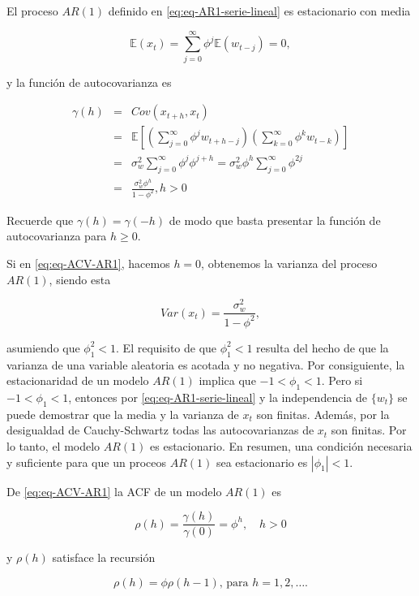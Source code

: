 \documentclass[12pt,]{krantz}
\theoremstyle{definition}
\theoremstyle{definition}
\theoremstyle{definition}
\theoremstyle{remark}
\begin{document}
El proceso \(AR(1)\) definido en \eqref{eq:eq-AR1-serie-lineal} es
estacionario con media

\[\mathbb{E}(x_t) = \sum_{j=0}^{\infty}\phi^j\mathbb{E}(w_{t-j})=0,\]

y la función de autocovarianza es

\begin{eqnarray}
\gamma(h) &=& Cov(x_{t+h},x_t) \nonumber \\
    &=& \mathbb{E}\left[\left(\sum_{j=0}^{\infty}\phi^jw_{t+h-j}\right) \left(\sum_{k=0}^{\infty}\phi^kw_{t-k}\right)\right] \nonumber \\
    &=& \sigma_w^2\sum_{j=0}^{\infty}\phi^j\phi^{j+h} = \sigma_w^2\phi^h\sum_{j=0}^{\infty}\phi^{2j} \nonumber \\
    &=& \frac{\sigma_w^2\phi^h}{1-\phi^2}, h>0
\label{eq:eq-ACV-AR1}
\end{eqnarray}

Recuerde que \(\gamma(h)=\gamma(-h)\) de modo que basta presentar la
función de autocovarianza para \(h\geq0\).

Si en \eqref{eq:eq-ACV-AR1}, hacemos \(h=0\), obtenemos la varianza del
proceso \(AR(1)\), siendo esta

\[Var(x_t)=\frac{\sigma_w^2}{1-\phi^2},\]

asumiendo que \(\phi_1^2<1\). El requisito de que \(\phi_1^2<1\) resulta
del hecho de que la varianza de una variable aleatoria es acotada y no
negativa. Por consiguiente, la estacionaridad de un modelo \(AR(1)\)
implica que \(-1<\phi_1<1\). Pero si \(-1<\phi_1<1\), entonces por
\eqref{eq:eq-AR1-serie-lineal} y la independencia de \(\{w_t\}\) se puede
demostrar que la media y la varianza de \(x_t\) son finitas. Además, por
la desigualdad de Cauchy-Schwartz todas las autocovarianzas de \(x_t\)
son finitas. Por lo tanto, el modelo \(AR(1)\) es estacionario. En
resumen, una condición necesaria y suficiente para que un proceos
\(AR(1)\) sea estacionario es \(|\phi_1|<1\).

De \eqref{eq:eq-ACV-AR1} la ACF de un modelo \(AR(1)\) es

\begin{equation}
\rho(h) = \frac{\gamma(h)}{\gamma(0)} = \phi^h, \quad h>0
\label{eq:eq-ACF-AR1}
\end{equation}

y \(\rho(h)\) satisface la recursión

\begin{equation}
\rho(h) = \phi\rho(h-1)\text{, para }h=1,2,\ldots.
\label{eq:eq-ACF-AR1-recursiva}
\end{equation}
\end{document}
